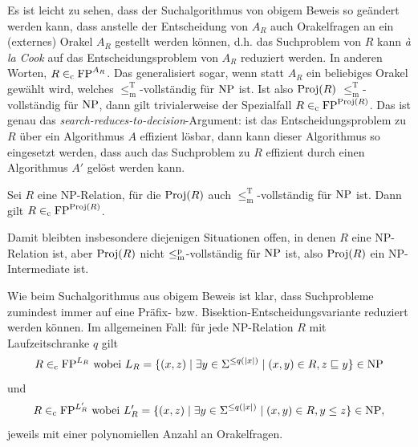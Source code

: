 Es ist leicht zu sehen, dass der Suchalgorithmus von obigem Beweis so geändert werden kann, dass anstelle der Entscheidung von $A_R$ auch Orakelfragen an ein (externes) Orakel $A_R$ gestellt werden können, d.h. das Suchproblem von $R$ kann \emph{à la Cook} auf das Entscheidungsproblem von $A_R$ reduziert werden. In anderen Worten, $R\in_\mathrm{c} \mathrm{FP}^{A_R}$. Das generalisiert sogar, wenn statt $A_R$ ein beliebiges Orakel gewählt wird, welches $\leq_\mathrm{m}^\mathrm{T}$-vollständig für $\mathrm{NP}$ ist. Ist also $\operatorname{Proj}(R)$ $\leq_\mathrm{m}^\mathrm{T}$-vollständig für $\mathrm{NP}$, dann gilt trivialerweise der Spezialfall $R\in_\mathrm{c} \mathrm{FP}^{\operatorname{Proj}(R)}$. Das ist genau das \emph{search-reduces-to-decision}-Argument: ist das Entscheidungsproblem zu $R$ über ein Algorithmus $A$ effizient lösbar, dann kann dieser Algorithmus so eingesetzt werden, dass auch das Suchproblem zu $R$ effizient durch einen Algorithmus $A'$ gelöst werden kann.

\begin{corollary}\label{cor:search-to-decision}
    Sei $R$ eine NP-Relation, für die $\operatorname{Proj}(R)$ auch $\leq_\mathrm{m}^\mathrm{T}$-vollständig für $\mathrm{NP}$ ist.
    Dann gilt $R\in_\mathrm{c} \mathrm{FP}^{\operatorname{Proj}(R)}$.
\end{corollary}
%

Damit bleibten insbesondere diejenigen Situationen offen, in denen $R$ eine NP-Relation ist, aber $\operatorname{Proj}(R)$ nicht $\leq_\mathrm{m}^\mathrm{p}$-vollständig für $\mathrm{NP}$ ist, also $\operatorname{Proj}(R)$ ein NP-Intermediate ist.


Wie beim Suchalgorithmus aus obigem Beweis ist klar, dass Suchprobleme zumindest immer auf eine Präfix- bzw. Bisektion-Entscheidungsvariante reduziert werden können.
Im allgemeinen Fall: für jede NP-Relation $R$ mit Laufzeitschranke $q$ gilt
\[ R \in_\mathrm{c} \mathrm{FP}^{L_R} \text{ wobei } L_R = \{ (x, z) \mid \exists y\in\Sigma^{\leq q(|x|)} \mid (x, y)\in R, z\sqsubseteq y \}\in\mathrm{NP} \]
und 
\[ R \in_\mathrm{c} \mathrm{FP}^{L'_R} \text{ wobei } L'_R = \{ (x, z) \mid \exists y\in\Sigma^{\leq q(|x|)} \mid (x, y) \in R, y\leq z \}\in\mathrm{NP}, \]
jeweils mit einer polynomiellen Anzahl an Orakelfragen.


